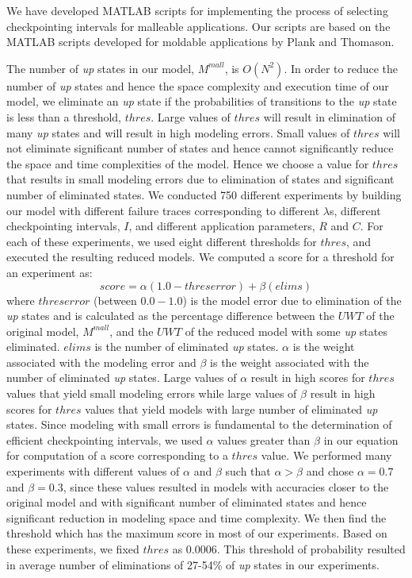 \documentclass[conference,10pt]{IEEEtran}
\begin{document}
We have developed MATLAB scripts for implementing the process of
selecting checkpointing intervals for malleable applications.
Our scripts are based on the MATLAB scripts
developed for moldable applications by Plank and
Thomason\cite{plank-processorallocation-jpdc01}.

The number of {\em up} states in our model, $M^{mall}$, is $O(N^2)$. In order
to reduce the number of {\em up} states and hence the space complexity
and execution time of our model, we eliminate an {\em up} state if the
probabilities of transitions to the {\em up} state is less than a threshold,
$thres$. Large values of $thres$ will result in
elimination of many {\em up} states and will result in high modeling
errors. Small values of $thres$  will not eliminate significant
number of states and hence cannot significantly reduce the space and
time complexities of the model. Hence we choose a value for
$thres$ that results in small modeling errors due to elimination of
states and significant number of eliminated states.
We conducted 750 different experiments by building our model with different
failure traces corresponding to different $\lambda$s, different
checkpointing intervals, $I$, and different application parameters, $R$ and
$C$. For each of these experiments, we used eight different thresholds for
$thres$, and executed the resulting reduced models. We computed a
score for a threshold for an experiment as:
\begin{equation}
score = \alpha (1.0-threserror)+\beta (elims)
\end{equation}
where $threserror$ (between $0.0-1.0$) is the model error due to
elimination of the {\em up} states and is calculated as the percentage
difference between the $UWT$ of the original model, $M^{mall}$, and
the $UWT$ of the reduced model with some {\em up} states eliminated. $elims$
is the number of eliminated {\em up} states. $\alpha$ is the weight
associated with the modeling error and $\beta$ is the weight
associated with the number of eliminated {\em up} states. Large values of
$\alpha$ result in high scores for $thres$ values that yield small
modeling errors while large values of $\beta$ result in high scores
for $thres$ values that yield models with large number of eliminated
{\em up} states. Since modeling with small errors is fundamental to the
determination of efficient checkpointing intervals, we used $\alpha$
values greater than $\beta$ in our equation for computation of a score
corresponding to a $thres$ value. We performed many experiments with
different values of $\alpha$ and $\beta$ such that $\alpha > \beta$
and chose $\alpha=0.7$ and $\beta=0.3$, since these values resulted in models with
accuracies closer to the original model and with significant number of
eliminated states and hence significant reduction in modeling space
and time complexity. We then find the threshold which has the
maximum score in most of our experiments. Based on these experiments,
we fixed $thres$ as $0.0006$. This threshold of probability resulted
in average number of eliminations of 27-54\% of {\em up} states in our
experiments.
\end{document}
